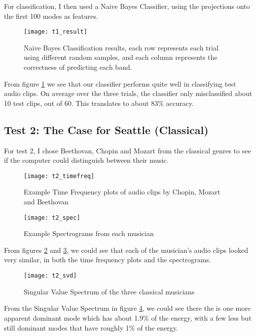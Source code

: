 \documentclass[12pt, a4paper]{article}
\begin{document}
For classification, I then used a Naive Bayes Classifier, using the projections onto the first 100 modes as features. 
\begin{figure}[H]
\centering
\texttt{[image: t1\_result]}
\caption{Naive Bayes Classification results, each row represents each trial using different random samples, and each column represents the correctness of predicting each band.}
\label{fig:t15}
\end{figure}
From figure \ref{fig:t15} we see that our classifier performs quite well in classifying test audio clips. On average over the three trials, the classifier only misclassified about 10 test clips, out of 60. This translates to about 83\% accuracy.

\subsection{Test 2: The Case for Seattle (Classical)}
For test 2, I chose Beethovan, Chopin and Mozart from the classical genres to see if the computer could distinguish between their music.

\begin{figure}[H]
\centering
\texttt{[image: t2\_timefreq]}
\caption{Example Time Frequency plots of audio clips by Chopin, Mozart and Beethovan}
\label{fig:t21}
\end{figure}
\begin{figure}[H]
\texttt{[image: t2\_spec]}
\caption{Example Spectrograms from each musician}
\label{fig:t22}
\end{figure}
From figures \ref{fig:t21} and \ref{fig:t22}, we could see that each of the musician's audio clips looked very similar, in both the time frequency plots and the spectrograms. 

\begin{figure}[H]
\centering
\texttt{[image: t2\_svd]}
\caption{Singular Value Spectrum of the three classical musicians}
\label{fig:t23}
\end{figure}
From the Singular Value Spectrum in figure \ref{fig:t23}, we could see there the is one more apparent dominant mode which has about 1.9\% of the energy, with a few less but still dominant modes that have roughly 1\% of the energy. 
\end{document}

